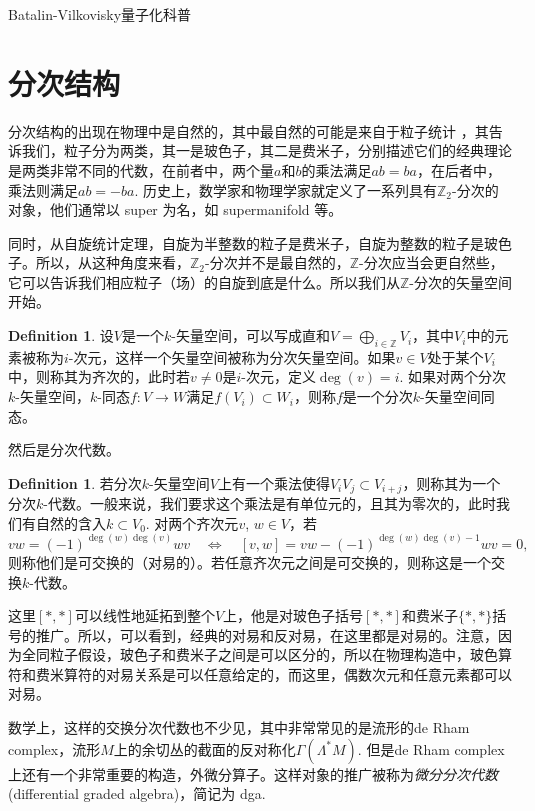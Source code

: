 \documentclass[12pt]{article}
\theoremstyle{definition}
\newtheorem{defi}[para]{Definition}
\theoremstyle{plain}
\begin{document}
Batalin-Vilkovisky量子化科普

\section{分次结构}

分次结构的出现在物理中是自然的，其中最自然的可能是来自于粒子统计%
，其告诉我们，粒子分为两类，其一是玻色子，其二是费米子，分别描述它们的经典理论是两类非常不同的代数，在前者中，两个量$a$和$b$的乘法满足$ab=ba$，在后者中，乘法则满足$ab=-ba$. 历史上，数学家和物理学家就定义了一系列具有$\mathbb{Z}_2$-分次的对象，他们通常以 super 为名，如 supermanifold 等。

同时，从自旋统计定理，自旋为半整数的粒子是费米子，自旋为整数的粒子是玻色子。所以，从这种角度来看，$\mathbb{Z}_2$-分次并不是最自然的，$\mathbb{Z}$-分次应当会更自然些，它可以告诉我们相应粒子（场）的自旋到底是什么。所以我们从$\mathbb{Z}$-分次的矢量空间开始。

\begin{defi}
    设$V$是一个$k$-矢量空间，可以写成直和$V=\bigoplus_{i\in\mathbb Z} V_i$，其中$V_i$中的元素被称为$i$-次元，这样一个矢量空间被称为分次矢量空间。如果$v\in V$处于某个$V_i$中，则称其为齐次的，此时若$v\neq 0$是$i$-次元，定义$\deg(v)=i$. 如果对两个分次$k$-矢量空间，$k$-同态$f:V\to W$满足$f(V_i)\subset W_i$，则称$f$是一个分次$k$-矢量空间同态。
\end{defi}

然后是分次代数。

\begin{defi}
    若分次$k$-矢量空间$V$上有一个乘法使得$V_iV_j\subset V_{i+j}$，则称其为一个分次$k$-代数。一般来说，我们要求这个乘法是有单位元的，且其为零次的，此时我们有自然的含入$k\subset V_0$. 对两个齐次元$v$, $w\in V$，若
\[
    vw=(-1)^{\deg(w)\deg(v)}wv\quad \Leftrightarrow \quad 
    [v,w]=vw-(-1)^{\deg(w)\deg(v)-1}wv=0,
\]
则称他们是可交换的（对易的）。若任意齐次元之间是可交换的，则称这是一个交换$k$-代数。
\end{defi}

这里$[*,*]$可以线性地延拓到整个$V$上，他是对玻色子括号$[*,*]$和费米子$\{*,*\}$括号的推广。所以，可以看到，经典的对易和反对易，在这里都是对易的。注意，因为全同粒子假设，玻色子和费米子之间是可以区分的，所以在物理构造中，玻色算符和费米算符的对易关系是可以任意给定的，而这里，偶数次元和任意元素都可以对易。

数学上，这样的交换分次代数也不少见，其中非常常见的是流形的de Rham complex，流形$M$上的余切丛的截面的反对称化$\Gamma(\Lambda^*M)$. 但是de Rham complex上还有一个非常重要的构造，外微分算子。这样对象的推广被称为\textit{微分分次代数} (differential graded algebra)，简记为 dga. 
\end{document}
